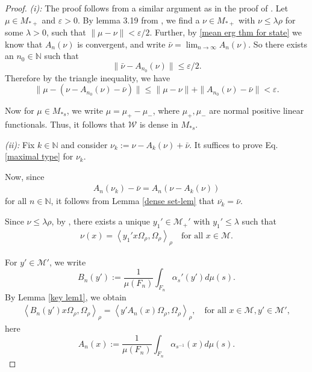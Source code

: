 \documentclass[11pt]{amsart}
\theoremstyle{definition}
\theoremstyle{myremark}
\numberwithin{equation}{section}
\def\N{\mathbb N}
\newcommand{\CM}{\mathcal{M}}
\newcommand\inner[2]{\left\langle #1, #2 \right\rangle}
\begin{document}
\begin{proof}
	\emph{(i):} The proof follows from a similar argument as in the proof of \cite[Lemma 4.9, Part (i)]{Bik-Dip-neveu}. Let $\mu\in M_{*+}$ and $\varepsilon>0$. By lemma 3.19 from \cite{hiai2021lectures}, we find a $\nu\in M_{*+}$ with $\nu\leq \lambda\rho$ for some $\lambda>0$, such that $\|\mu-\nu\|<\varepsilon/2$. Further, by \ref{mean erg thm for state} we know that $A_n(\nu)$ is convergent, and write $\bar{\nu}=\lim_{n\to\infty} A_n(\nu)$.
So there exists an $n_0\in\mathbb{N}$ such that
\[
\|\bar{\nu}-A_{n_0}(\nu)\|\leq \varepsilon/2.
\]
Therefore by the triangle inequality, we have
\[
\|\mu-(\nu-A_{n_0}(\nu)-\bar{\nu})\|
\leq \|\mu-\nu\|+\|A_{n_0}(\nu)-\bar{\nu}\|
<\varepsilon.
\]

\noindent Now for $\mu\in M_{*s}$, we write $\mu=\mu_{+}-\mu_{-}$, where
$\mu_{+},\mu_{-}$ are normal positive linear functionals. Thus, it follows
that $\mathcal{W}$ is dense in $M_{*s}$.
	
	\emph{(ii):} Fix $k \in \N$ and consider $\nu_k := \nu - A_{k}(\nu ) + \bar{\nu}$. It suffices to prove Eq. \ref{maximal type} for $\nu_k$. 
	
	Now, since 
	\begin{align*}
		A_{n}(\nu_k) - \bar{\nu} = A_{n}(\nu - A_{k}(\nu))
	\end{align*}
	for all $n \in \N$, it follows from Lemma \ref{dense set-lem} that $\overline{\nu_k}= \bar{\nu}$. 
	
	Since $\nu \leq \lambda \rho $, by \cite[Lemma 4.4]{Bik-Dip-neveu}, there exists a unique $y_1' \in \CM_+'$ with $y_1' \leq \lambda$ such that 
	\begin{align*}
		\nu(x)= \inner{y_1' x \Omega_{\rho}}{ \Omega_{\rho}}_{\rho} \quad \text{for all } x \in \CM.
	\end{align*}
	

	
	For $y' \in \CM'$, we write 
	\[
	B_{n}(y') := \frac{1}{\mu(F_{n})}\int_{F_{n}} \alpha_{s}'(y') d \mu(s).
	\]
	By Lemma \ref{key lem1}, we obtain
	\begin{align*}
		\inner{B_{n}(y') x \Omega_{\rho}}{ \Omega_{\rho}}_{\rho} = \inner{y' A_{n}(x) \Omega_{\rho}}{ \Omega_{\rho}}_{\rho}, \quad \text{for all } x \in \CM,  y' \in \CM',
	\end{align*}
	here 
	\[
	A_{n}(x):= \frac{1}{\mu(F_{n})}\int_{F_{n}} \alpha_{s^{-1}}(x) d \mu(s).
	\] 
	

\end{proof}
\end{document}
